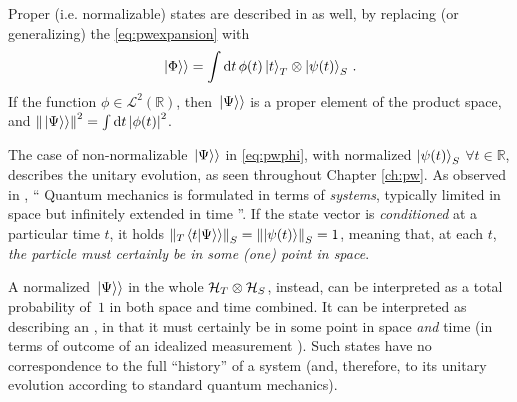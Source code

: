 Proper (i.e. normalizable) states are described in \citereset\cite{Lloyd:Time} as well, by replacing (or generalizing)
the \eqref{eq:pwexpansion} with
\begin{equation}\label{eq:pwphi}
  \left.\left| \Phi \right\rangle\right\rangle =
    \int \dd{t} \phi(t) \ket{t}_T \otimes \ket{\psi(t)}_S \, \text{.}
\end{equation}
If the function $\phi \in \mathscr{L}^2(\mathbb{R})$,
then $\left.\left| \Psi \right\rangle\right\rangle$ is a proper element of the product space,
and $\norm{\left.\left| \Psi \right\rangle\right\rangle}^2 = \int \dd{t} \abs{\phi(t)}^2$.

The case of non-normalizable $\left.\left| \Psi \right\rangle\right\rangle$ in \eqref{eq:pwphi},
with normalized $\ket{\psi(t)}_S$ $\forall t \in \mathbb{R}$,
describes the unitary evolution, as seen throughout Chapter \ref{ch:pw}.
As observed in \cite{Maccone:QGR},
``%
  Quantum mechanics is formulated in terms of \emph{systems},
  typically limited in space but infinitely extended in time%
''.
If the state vector is \emph{conditioned} at a particular time $t$,
it holds $\norm{_{T}\!\left.\left\langle t \middle| \Psi \right\rangle\right\rangle}_S = \norm{\ket{\psi(t)}}_S = 1$,
meaning that, at each $t$,
\emph{the particle must certainly be in some (one) point in space}.

A normalized $\left.\left| \Psi \right\rangle\right\rangle$ in the whole $\mathcal{H}_T \otimes \mathcal{H}_S$,
instead,
can be interpreted as a total probability of~$1$ in both space and time combined.
It can be interpreted as describing an ,
in that it
must certainly be in some point in space
\emph{and} time (in terms of outcome of an idealized measurement%
).
Such states have no correspondence to the full ``history'' of a system
(and, therefore, to its unitary evolution according to standard quantum mechanics).

